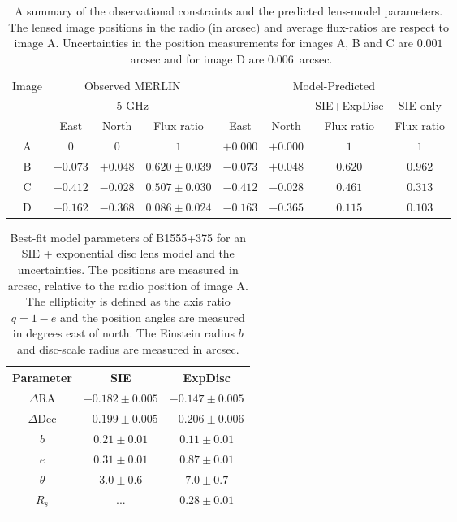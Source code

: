\documentclass[a4paper,fleqn,usenatbib,useAMS]{mnras}
\begin{document}
\begin{table}
\centering
\caption{A summary of the observational constraints and the predicted lens-model parameters. The lensed image positions in the radio \citep{Marlow99} (in arcsec) and average flux-ratios \citep{K03} are respect to image A. Uncertainties in the position measurements for images A, B and C are $0.001$~arcsec and for image D are $0.006$~arcsec.}
\begin{tabular}{cccccccc}
\hline
Image	&\multicolumn{3}{c}{Observed MERLIN} 	 	& \multicolumn{4}{c}{Model-Predicted}\\
		&\multicolumn{3}{c}{5 GHz}		& & & {SIE+ExpDisc} & SIE-only\\
		&East &North & Flux ratio &East 	&North & Flux ratio &Flux ratio\\ 
\hline
A  &$0$    		&$0$			&  $1$ 				&$+0.000$  &$+0.000$	& $1$ 		& $1$\\  
B  &$-0.073$	&$+0.048$	& $0.620 \pm 0.039$ 	&$-0.073$ &$+0.048$		& $0.620$ 	& $0.962$ \\  
C  &$-0.412$ 	&$-0.028$	& $0.507\pm 0.030$	&$-0.412$ &$-0.028$		& $0.461$ 	& $0.313$\\  
D  &$-0.162$	&$-0.368$	& $0.086 \pm 0.024$ 	&$-0.163$ &$-0.365$		& $0.115$ 	& $0.103$\\  
\hline
\end{tabular}
\label{tab:results}
\end{table}

\begin{table}
\centering
\caption{Best-fit model parameters of B1555+375 for an SIE + exponential disc lens model and the uncertainties. The positions are measured in arcsec, relative to the radio position of image A. The ellipticity is defined as the axis ratio $q=1-e$ and the position angles are measured in degrees east of north. The Einstein radius $b$ and disc-scale radius are measured in arcsec.}
\begin{tabular}{ccc}
\hline 
Parameter  & SIE & ExpDisc \\
\hline
$\Delta$RA	& $-0.182 \pm 0.005$		& $-0.147 \pm 0.005$\\
$\Delta$Dec	& $-0.199 \pm 0.005$		& $-0.206 \pm 0.006$ \\
$b$ 			& $0.21 \pm 0.01$  		& $0.11 \pm 0.01$ \\
$e$	  		& $0.31 \pm 0.01$			& $0.87 \pm 0.01$ \\
$\theta$ 		& $3.0 \pm 0.6$			& $7.0 \pm 0.7$	 \\
$R_s$			& ...  						& $0.28 \pm 0.01$	 \\
\hline
\label{tab:model}
\end{tabular}
\end{table}
\end{document}
